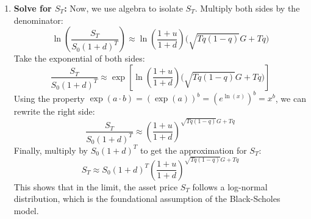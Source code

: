 \begin{enumerate}
    \item \textbf{Solve for $S_T$:} Now, we use algebra to isolate $S_T$. Multiply both sides by the denominator:
    \begin{equation*}
        \ln\left(\frac{S_T}{S_0(1+d)^T}\right) \approx \ln\left(\frac{1+u}{1+d}\right) \Big( \sqrt{Tq(1-q)}G + Tq \Big)
    \end{equation*}
    Take the exponential of both sides:
    \begin{equation*}
        \frac{S_T}{S_0(1+d)^T} \approx \exp\left[ \ln\left(\frac{1+u}{1+d}\right) \Big( \sqrt{Tq(1-q)}G + Tq \Big) \right]
    \end{equation*}
    Using the property $\exp(a \cdot b) = (\exp(a))^b = (e^{\ln(x)})^b = x^b$, we can rewrite the right side:
    \begin{equation*}
        \frac{S_T}{S_0(1+d)^T} \approx \left(\frac{1+u}{1+d}\right)^{\sqrt{Tq(1-q)}G + Tq}
    \end{equation*}
    Finally, multiply by $S_0(1+d)^T$ to get the approximation for $S_T$:
    \begin{equation*}
        S_T \approx S_0(1+d)^T \left(\frac{1+u}{1+d}\right)^{\sqrt{Tq(1-q)}G + Tq}
    \end{equation*}
    This shows that in the limit, the asset price $S_T$ follows a log-normal distribution, which is the foundational assumption of the Black-Scholes model.
\end{enumerate}